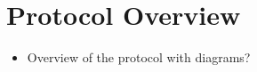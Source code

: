 \chapter*{Protocol Overview}

\begin{itemize}
\item Overview of the protocol with diagrams? 
\end{itemize}